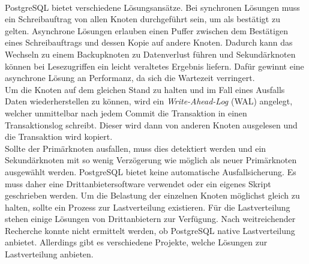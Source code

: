 \paragraph{}
PostgreSQL bietet verschiedene Lösungsansätze.
Bei synchronen Lösungen muss ein Schreibauftrag von allen Knoten durchgeführt sein, um als bestätigt zu gelten.
Asynchrone Lösungen erlauben einen Puffer zwischen dem Bestätigen eines Schreibauftrags und dessen Kopie auf andere Knoten.
Dadurch kann das Wechseln zu einem Backupknoten zu Datenverlust führen und Sekundärknoten können bei Lesezugriffen ein leicht veraltetes Ergebnis liefern.
Dafür gewinnt eine asynchrone Lösung an Performanz, da sich die Wartezeit verringert. \cite{db:postgresHighAvailability}\\
Um die Knoten auf dem gleichen Stand zu halten und im Fall eines Ausfalls Daten wiederherstellen zu können, wird ein \textit{Write-Ahead-Log} (WAL) angelegt, welcher unmittelbar nach jedem Commit die Transaktion in einen Transaktionslog schreibt.
Dieser wird dann von anderen Knoten ausgelesen und die Transaktion wird kopiert. \cite{db:postgresWriteAheadLogging}\\
Sollte der Primärknoten ausfallen, muss dies detektiert werden und ein Sekundärknoten mit so wenig Verzögerung wie möglich als neuer Primärknoten ausgewählt werden.
PostgreSQL bietet keine automatische Ausfallsicherung.
Es muss daher eine Drittanbietersoftware verwendet oder ein eigenes Skript geschrieben werden.
Um die Belastung der einzelnen Knoten möglichst gleich zu halten, sollte ein Prozess zur Lastverteilung existieren.
Für die Lastverteilung stehen einige Lösungen von Drittanbietern zur Verfügung.
Nach weitreichender Recherche konnte nicht ermittelt werden, ob PostgreSQL native Lastverteilung anbietet.
Allerdings gibt es verschiedene Projekte, welche Lösungen zur Lastverteilung anbieten. \cite{db:postgresLoadBalancing}


